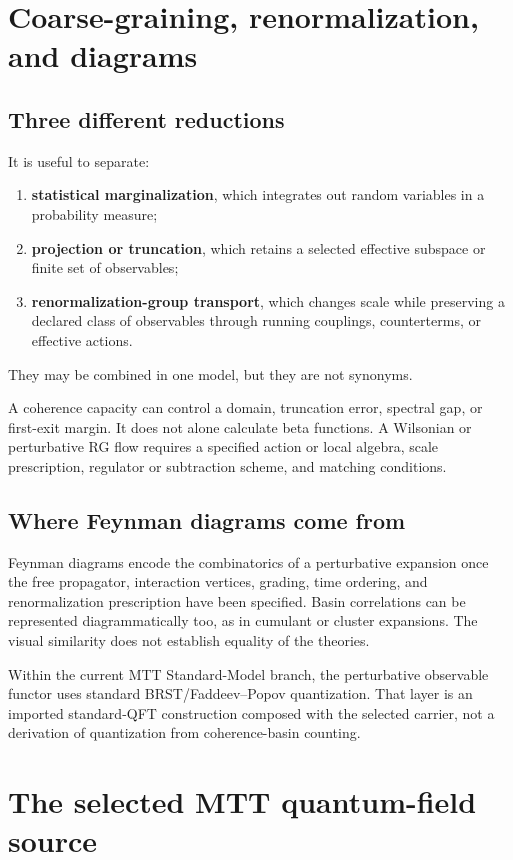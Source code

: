 \documentclass[11pt]{article}
\begin{document}
\section{Coarse-graining, renormalization, and diagrams}

\subsection{Three different reductions}

It is useful to separate:
\begin{enumerate}
\item \textbf{statistical marginalization}, which integrates out random
variables in a probability measure;
\item \textbf{projection or truncation}, which retains a selected effective
subspace or finite set of observables;
\item \textbf{renormalization-group transport}, which changes scale while
preserving a declared class of observables through running couplings,
counterterms, or effective actions.
\end{enumerate}
They may be combined in one model, but they are not synonyms.

A coherence capacity can control a domain, truncation error, spectral gap,
or first-exit margin.  It does not alone calculate beta functions.  A
Wilsonian or perturbative RG flow requires a specified action or local
algebra, scale prescription, regulator or subtraction scheme, and matching
conditions.

\subsection{Where Feynman diagrams come from}

Feynman diagrams encode the combinatorics of a perturbative expansion once
the free propagator, interaction vertices, grading, time ordering, and
renormalization prescription have been specified.  Basin correlations can
be represented diagrammatically too, as in cumulant or cluster expansions.
The visual similarity does not establish equality of the theories.

Within the current MTT Standard-Model branch, the perturbative observable
functor uses standard BRST/Faddeev--Popov quantization.  That layer is an
imported standard-QFT construction composed with the selected carrier, not
a derivation of quantization from coherence-basin counting.

\section{The selected MTT quantum-field source}
\end{document}
